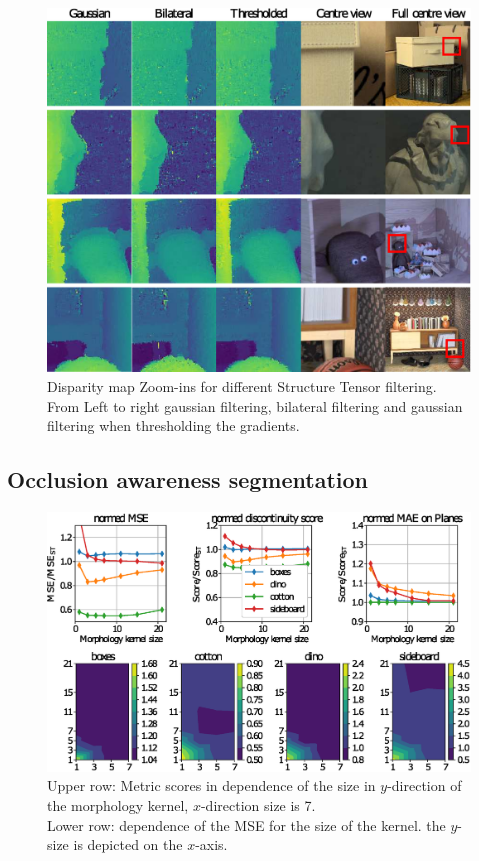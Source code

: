 \documentclass  [
  paper    = a4,
  BCOR     = 10mm,
  twoside,
  fontsize = 12pt,
  fleqn,
  toc      = bibnumbered,
  toc      = listofnumbered,
  numbers  = noendperiod,
  headings = normal,
  listof   = leveldown,
  version  = 3.03
]                                       {scrreprt}
\begin{document}
\begin{figure}
	\centering
	\includegraphics[width=1\linewidth]{images/thresh_results}
	\caption[Disparity map Zoom-ins for different methods]{Disparity map Zoom-ins for different Structure Tensor filtering. From Left to right gaussian filtering, bilateral filtering and gaussian filtering when thresholding the gradients.}
	\label{fig:threshresults}
\end{figure}


\subsection{Occlusion awareness segmentation}
\begin{figure}
	\centering
	\includegraphics[width=1\linewidth]{images/thresh_segm_morph}
	\caption[Segmentation of Epi dependence on the morphology kernel]{Upper row: Metric scores in dependence of the size in $y$-direction of the morphology kernel, $x$-direction size is 7.\\ Lower row: dependence of the MSE for the size of the kernel. the $y$-size is depicted on the $x$-axis.}
	\label{fig:threshsegmmorph}
\end{figure}
\end{document}
